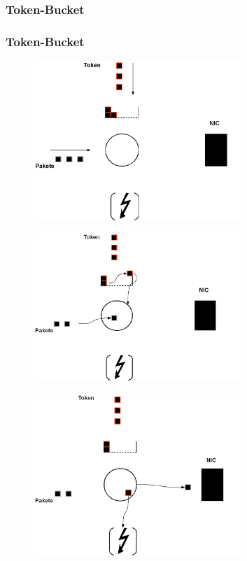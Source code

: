 \documentclass[14pt]{beamer}
\begin{document}
\subsubsection{Token-Bucket}
\begin{frame}
\frametitle{Token-Bucket}
\begin{figure}[h!]
      \includegraphics[width=0.7\textwidth]{GFX/tb-beginning}
  \end{figure}
\end{frame}


\begin{frame}
\begin{figure}[h!]
      \includegraphics[width=0.7\textwidth]{GFX/tb-token-taken}
  \end{figure}
\end{frame}

\begin{frame}
\begin{figure}[h!]
      \includegraphics[width=0.7\textwidth]{GFX/tb-token-finished}
  \end{figure}
\end{frame}
\end{document}
